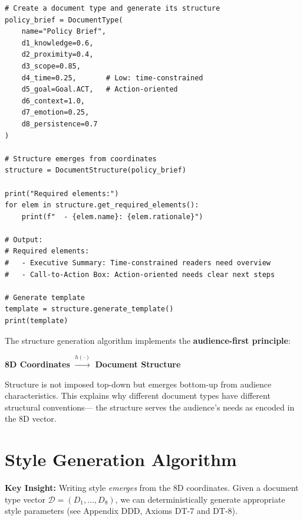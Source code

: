 \begin{verbatim}
# Create a document type and generate its structure
policy_brief = DocumentType(
    name="Policy Brief",
    d1_knowledge=0.6,
    d2_proximity=0.4,
    d3_scope=0.85,
    d4_time=0.25,       # Low: time-constrained
    d5_goal=Goal.ACT,   # Action-oriented
    d6_context=1.0,
    d7_emotion=0.25,
    d8_persistence=0.7
)

# Structure emerges from coordinates
structure = DocumentStructure(policy_brief)

print("Required elements:")
for elem in structure.get_required_elements():
    print(f"  - {elem.name}: {elem.rationale}")

# Output:
# Required elements:
#   - Executive Summary: Time-constrained readers need overview
#   - Call-to-Action Box: Action-oriented needs clear next steps

# Generate template
template = structure.generate_template()
print(template)
\end{verbatim}

\begin{tcolorbox}[colback=yellow!5!white, colframe=yellow!75!black,
    title=Key Insight: Emergent Structure]

The structure generation algorithm implements the \textbf{audience-first principle}:

\begin{center}
\textbf{8D Coordinates} $\xrightarrow{h(\cdot)}$ \textbf{Document Structure}
\end{center}

Structure is not imposed top-down but emerges bottom-up from audience characteristics.
This explains why different document types have different structural conventions---
the structure serves the audience's needs as encoded in the 8D vector.

\end{tcolorbox}


\section{Style Generation Algorithm}
\label{sec:doctype-style}

\textbf{Key Insight:} Writing style \textit{emerges} from the 8D coordinates.
Given a document type vector $\mathcal{D} = (D_1, ..., D_8)$, we can deterministically
generate appropriate style parameters (see Appendix DDD, Axioms DT-7 and DT-8).

